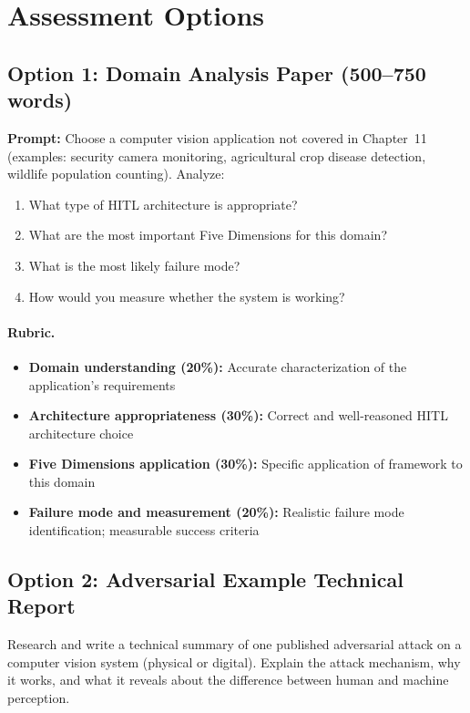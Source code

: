 \section{Assessment Options}

\subsection{Option 1: Domain Analysis Paper (500--750 words)}

\textbf{Prompt:} Choose a computer vision application not covered in Chapter~11 (examples: security camera monitoring, agricultural crop disease detection, wildlife population counting). Analyze:
\begin{enumerate}
    \item What type of HITL architecture is appropriate?
    \item What are the most important Five Dimensions for this domain?
    \item What is the most likely failure mode?
    \item How would you measure whether the system is working?
\end{enumerate}

\paragraph{Rubric.}
\begin{itemize}
    \item \textbf{Domain understanding (20\%):} Accurate characterization of the application's requirements
    \item \textbf{Architecture appropriateness (30\%):} Correct and well-reasoned HITL architecture choice
    \item \textbf{Five Dimensions application (30\%):} Specific application of framework to this domain
    \item \textbf{Failure mode and measurement (20\%):} Realistic failure mode identification; measurable success criteria
\end{itemize}

\subsection{Option 2: Adversarial Example Technical Report}

Research and write a technical summary of one published adversarial attack on a computer vision system (physical or digital). Explain the attack mechanism, why it works, and what it reveals about the difference between human and machine perception.

